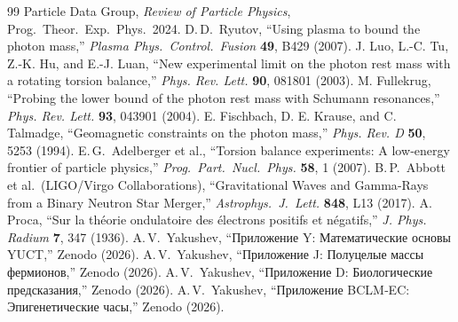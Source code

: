 \documentclass[11pt,a4paper]{article}
\begin{document}
	\begin{thebibliography}{99}
		 Particle Data Group, \emph{Review of Particle Physics}, Prog.\ Theor.\ Exp.\ Phys.\ 2024.
		 D.\,D.\ Ryutov, ``Using plasma to bound the photon mass,'' \emph{Plasma Phys.\ Control.\ Fusion} \textbf{49}, B429 (2007).
		 J. Luo, L.-C. Tu, Z.-K. Hu, and E.-J. Luan, ``New experimental limit on the photon rest mass with a rotating torsion balance,'' \emph{Phys. Rev. Lett.} \textbf{90}, 081801 (2003).
		 M. Fullekrug, ``Probing the lower bound of the photon rest mass with Schumann resonances,'' \emph{Phys. Rev. Lett.} \textbf{93}, 043901 (2004).
		 E. Fischbach, D. E. Krause, and C. Talmadge, ``Geomagnetic constraints on the photon mass,'' \emph{Phys. Rev. D} \textbf{50}, 5253 (1994).
		 E.\,G.\ Adelberger et al., ``Torsion balance experiments: A low‑energy frontier of particle physics,'' \emph{Prog.\ Part.\ Nucl.\ Phys.} \textbf{58}, 1 (2007).
		 B.\,P.\ Abbott et al.\ (LIGO/Virgo Collaborations), ``Gravitational Waves and Gamma‑Rays from a Binary Neutron Star Merger,'' \emph{Astrophys.\ J.\ Lett.} \textbf{848}, L13 (2017).
		 A. Proca, ``Sur la théorie ondulatoire des électrons positifs et négatifs,'' \emph{J. Phys. Radium} \textbf{7}, 347 (1936).
		 A.\,V.\ Yakushev, ``Приложение Y: Математические основы YUCT,'' Zenodo (2026).
		 A.\,V.\ Yakushev, ``Приложение J: Полуцелые массы фермионов,'' Zenodo (2026).
		 A.\,V.\ Yakushev, ``Приложение D: Биологические предсказания,'' Zenodo (2026).
		 A.\,V.\ Yakushev, ``Приложение BCLM‑EC: Эпигенетические часы,'' Zenodo (2026).
	\end{thebibliography}
	
\end{document}
